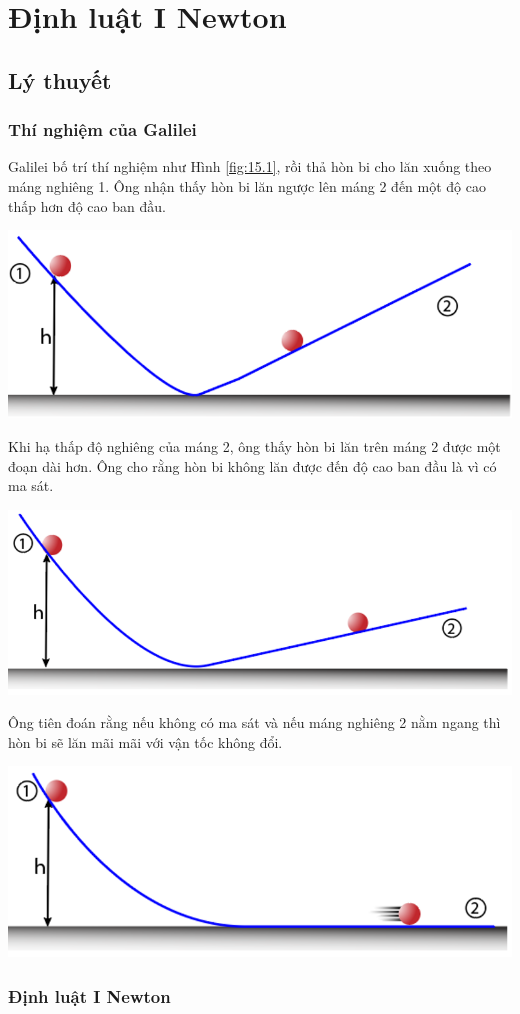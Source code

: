 \let\lesson\undefined
\newcommand{\lesson}{\phantomlesson{Bài 11: Ba định luật Newton về chuyển động}}
\chapter[Định luật I Newton]{Định luật I Newton}
\setcounter{section}{0}
\section{Lý thuyết}
\subsection{Thí nghiệm của Galilei}
Galilei bố trí thí nghiệm như Hình \ref{fig:15.1}, rồi thả hòn bi cho lăn xuống theo máng nghiêng 1. Ông nhận thấy hòn bi lăn ngược lên máng 2 đến một độ cao thấp hơn độ cao ban đầu.
\begin{center}
	\includegraphics[width=0.3\linewidth]{../figs/VN10-2023-PH-TP015-1}
	\label{fig:15.1}
\end{center}
Khi hạ thấp độ nghiêng của máng 2, ông thấy hòn bi lăn trên máng 2 được một đoạn dài hơn. Ông cho rằng hòn bi không lăn được đến độ cao ban đầu là vì có ma sát.
\begin{center}
	\includegraphics[width=0.3\linewidth]{../figs/VN10-2023-PH-TP015-2}
\end{center}
Ông tiên đoán rằng nếu không có ma sát và nếu máng nghiêng 2 nằm ngang thì hòn bi sẽ lăn mãi mãi với vận tốc không đổi.
\begin{center}
	\includegraphics[width=0.3\linewidth]{../figs/VN10-2023-PH-TP015-3}
\end{center}
\subsection{Định luật I Newton}
